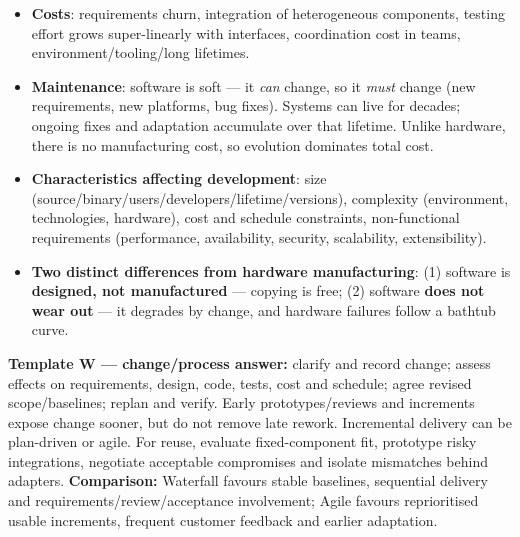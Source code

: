 \begin{studycolumns}
\begin{itemize}
\item \textbf{Costs}: requirements churn, integration of heterogeneous components, testing effort grows super-linearly with interfaces, coordination cost in teams, environment/\allowbreak{}tooling/\allowbreak{}long lifetimes.
\item \textbf{Maintenance}: software is soft --- it \emph{can} change, so it \emph{must} change (new requirements, new platforms, bug fixes). Systems can live for decades; ongoing fixes and adaptation accumulate over that lifetime. Unlike hardware, there is no manufacturing cost, so evolution dominates total cost.
\item \textbf{Characteristics affecting development}: size (source/\allowbreak{}binary/\allowbreak{}users/\allowbreak{}developers/\allowbreak{}lifetime/\allowbreak{}versions), complexity (environment, technologies, hardware), cost and schedule constraints, non-functional requirements (performance, availability, security, scalability, extensibility).
\item \textbf{Two distinct differences from hardware manufacturing}: (1) software is \textbf{designed, not manufactured} --- copying is free; (2) software \textbf{does not wear out} --- it degrades by change, and hardware failures follow a bathtub curve.
\end{itemize}


\par\needspace{65pt}\label{answer-waterfall}
\textbf{Template W --- change/\allowbreak{}process answer:} clarify and record change; assess effects on requirements, design, code, tests, cost and schedule; agree revised scope/\allowbreak{}baselines; replan and verify. Early prototypes/\allowbreak{}reviews and increments expose change sooner, but do not remove late rework. Incremental delivery can be plan-driven or agile. For reuse, evaluate fixed-component fit, prototype risky integrations, negotiate acceptable compromises and isolate mismatches behind adapters.
\textbf{Comparison:} Waterfall favours stable baselines, sequential delivery and requirements/\allowbreak{}review/\allowbreak{}acceptance involvement; Agile favours reprioritised usable increments, frequent customer feedback and earlier adaptation.
\end{studycolumns}

